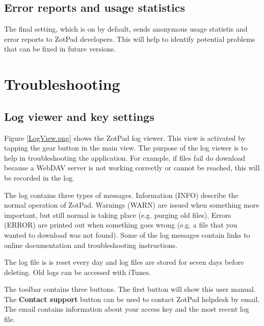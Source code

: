 \documentclass[oneside, openany, 12pt]{tufte-book}
\newcommand{\iphone}[1]{#1}
\newcommand{\ipad}[1]{}
\newcommand{\image}[2]{
	\center
	\fbox{\texttt{[image: images/iPhone/\{\#2]}}}

	\refstepcounter{figure}
	\smallskip\noindent\small Figure \thefigure: #1
	\label{#2}
	}
\newcommand{\iphone}[1]{}
\newcommand{\ipad}[1]{#1}
\newcommand{\image}[2]{
	\caption{#1}
	\label{#2}
	\fbox{\texttt{[image: images/iPad/\{\#2]}}}
	}
\begin{document}
\section{Error reports and usage statistics}

The final setting, which is on by default, sends anonymous usage statistis and error reports to ZotPad developers. This will help to identify potential problems that can be fixed in future versions.

\chapter{Troubleshooting}

\section{Log viewer and key settings}

Figure \ref{LogView.png} shows the ZotPad log viewer. This view is activated by tapping the gear button in the main view. The purpose of the log viewer is to help in troubleshooting the application. For example, if files fail do download because a WebDAV server is not working correctly or cannot be reached, this will be recorded in the log.

The log contains three types of messages. Information (INFO) describe the normal operation of ZotPad. Warnings (WARN) are issued when something more important, but still normal is taking place (e.g. purging old files). Errors (ERROR) are printed out when something goes wrong (e.g. a file that you wanted to download was not found). Some of the log messages contain links to online documentation and troubleshooting instructions.

The log file is is reset every day and log files are stored for seven days before deleting. Old logs can be accessed with iTunes. 

\begin{figure}
\image{ZotPad log viewer}{LogView.png}
\end{figure}

The toolbar contains \ipad{five}\iphone{three} buttons. The first button will show this user manual\ipad{ and the second button will open embedded UserVoice application which containing answers to frequently asked questions}. The \textbf{Contact support} button can be used to contact ZotPad helpdesk by email. The email contains information about your access key and the most recent log file.
\end{document}
